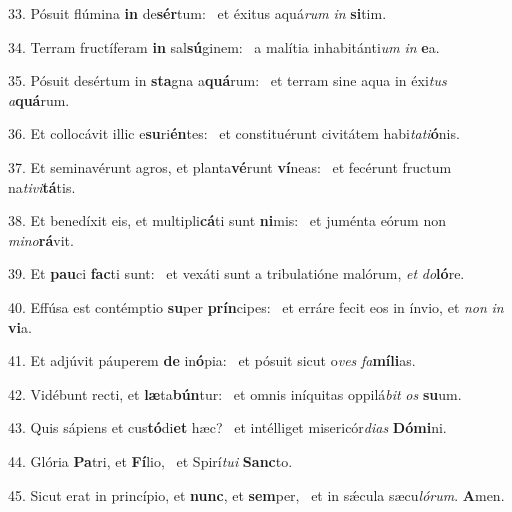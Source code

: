 33. Pósuit flúmina \textbf{in} de\textbf{sér}tum: \ast\  et éxitus aquá\textit{rum} \textit{in} \textbf{si}tim.\

34. Terram fructíferam \textbf{in} sal\textbf{sú}ginem: \ast\  a malítia inhabitánti\textit{um} \textit{in} \textbf{e}a.\

35. Pósuit desértum in \textbf{sta}gna a\textbf{quá}rum: \ast\  et terram sine aqua in éxi\textit{tus} \textit{a}\textbf{quá}rum.\

36. Et collocávit illic e\textbf{su}ri\textbf{én}tes: \ast\  et constituérunt civitátem habi\textit{ta}\textit{ti}\textbf{ó}nis.\

37. Et seminavérunt agros, et planta\textbf{vé}runt \textbf{ví}neas: \ast\  et fecérunt fructum na\textit{ti}\textit{vi}\textbf{tá}tis.\

38. Et benedíxit eis, et multipli\textbf{cá}ti sunt \textbf{ni}mis: \ast\  et juménta eórum non \textit{mi}\textit{no}\textbf{rá}vit.\

39. Et \textbf{pau}ci \textbf{fac}ti sunt: \ast\  et vexáti sunt a tribulatióne malórum, \textit{et} \textit{do}\textbf{ló}re.\

40. Effúsa est contémptio \textbf{su}per \textbf{prín}cipes: \ast\  et erráre fecit eos in ínvio, et \textit{non} \textit{in} \textbf{vi}a.\

41. Et adjúvit páuperem \textbf{de} in\textbf{ó}pia: \ast\  et pósuit sicut o\textit{ves} \textit{fa}\textbf{mí}\textbf{li}as.\

42. Vidébunt recti, et \textbf{læ}ta\textbf{bún}tur: \ast\  et omnis iníquitas oppilá\textit{bit} \textit{os} \textbf{su}um.\

43. Quis sápiens et cus\textbf{tó}di\textbf{et} hæc? \ast\  et intélliget misericór\textit{di}\textit{as} \textbf{Dó}\textbf{mi}ni.\

44. Glória \textbf{Pa}tri, et \textbf{Fí}lio, \ast\  et Spirí\textit{tu}\textit{i} \textbf{Sanc}to.\

45. Sicut erat in princípio, et \textbf{nunc}, et \textbf{sem}per, \ast\  et in sǽcula sæcu\textit{ló}\textit{rum}. \textbf{A}men.\

